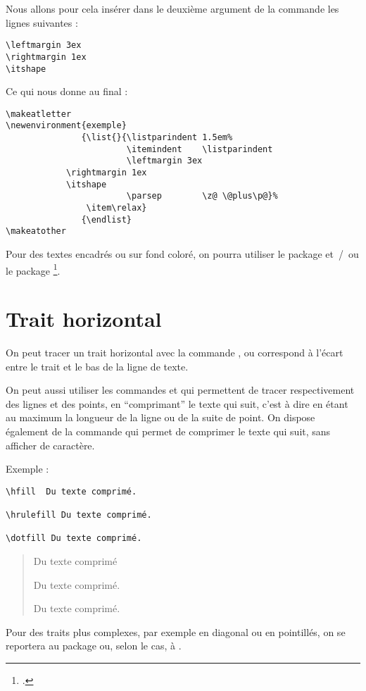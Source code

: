 Nous allons pour cela insérer dans le deuxième argument de la commande  les lignes suivantes :
\begin{verbatim}
\leftmargin 3ex
\rightmargin 1ex
\itshape
\end{verbatim}

Ce qui nous donne au final :

\begin{verbatim}
\makeatletter
\newenvironment{exemple}
               {\list{}{\listparindent 1.5em%
                        \itemindent    \listparindent
                        \leftmargin 3ex
		    \rightmargin 1ex
		    \itshape
                        \parsep        \z@ \@plus\p@}%
                \item\relax}
               {\endlist}
\makeatother
\end{verbatim}

\begin{plusloins}
Pour des textes encadrés ou sur fond coloré, on pourra utiliser le package  et~/~ou le package \footcites[On peut également consulter][qui regorge d'exemple pratique de \enquote{mise en boîte}]{frama}[on consultera en particulier][]{frama_boites}. 
\end{plusloins}

\section{Trait horizontal}\label{filets}

On peut tracer un trait horizontal avec la commande , ou  correspond à l'écart entre le trait et le bas de la ligne de texte.

On peut aussi utiliser les commandes  et  qui permettent de tracer respectivement des lignes et des points, en \enquote{comprimant} le texte qui suit, c'est à dire en étant au maximum la longueur de la ligne ou de la suite de point. On dispose également de la commande  qui permet de comprimer le texte qui suit, sans afficher de caractère.

Exemple :
\begin{verbatim}
\hfill	Du texte comprimé.

\hrulefill Du texte comprimé.

\dotfill Du texte comprimé.
\end{verbatim}

\begin{quotation}
\hfill Du texte comprimé

\hrulefill Du texte comprimé.

\dotfill Du texte comprimé.
\end{quotation}

Pour des traits plus complexes, par exemple en diagonal ou en pointillés, on se reportera au package  ou, selon le cas, à . 



